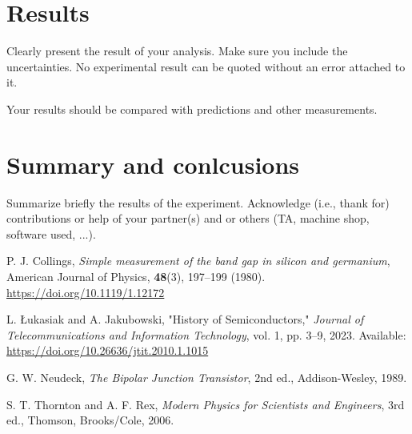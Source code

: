 \documentclass[12pt,letterpaper,onecolumn]{article}
\begin{document}

\section{Results}

Clearly present the result of your analysis. Make sure
you include the uncertainties. No experimental result
can be quoted without an error attached to it.

Your results should be compared with predictions and other
measurements.



\section{Summary and conlcusions}

Summarize briefly the results of the experiment.
Acknowledge (i.e., thank for) contributions or help
of your partner(s) and or
others (TA, machine shop, software used, ...).


\begin{thebibliography}{9}

P. J. Collings, 
\textit{Simple measurement of the band gap in silicon and germanium}, 
American Journal of Physics, \textbf{48}(3), 197--199 (1980). 
\href{https://doi.org/10.1119/1.12172}{https://doi.org/10.1119/1.12172}

L. Łukasiak and A. Jakubowski, 
"History of Semiconductors," 
\textit{Journal of Telecommunications and Information Technology}, vol. 1, pp. 3–9, 2023. 
Available: \url{https://doi.org/10.26636/jtit.2010.1.1015}

G. W. Neudeck, 
\textit{The Bipolar Junction Transistor}, 2nd ed., 
Addison-Wesley, 1989.

S. T. Thornton and A. F. Rex, 
\textit{Modern Physics for Scientists and Engineers}, 3rd ed., 
Thomson, Brooks/Cole, 2006.

\end{thebibliography}

\end{document}
